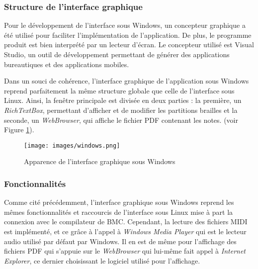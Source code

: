 

\subsubsection{Structure de l'interface graphique}

Pour le développement de l'interface sous Windows, un concepteur graphique a été utilisé pour faciliter l'implémentation de l'application. De plus, le programme produit est bien interprété par un lecteur d'écran. Le concepteur utilisé est Visual Studio, un outil de développement permettant de générer des applications bureautiques et des applications mobiles.

Dans un souci de cohérence, l'interface graphique de l'application sous Windows reprend parfaitement la même structure globale que celle de l'interface sous Linux. Ainsi, la fenêtre principale est divisée en deux parties : la première, un \textit{RichTextBox}, permettant d'afficher et de modifier les partitions brailles et la seconde, un \textit{WebBrowser}, qui affiche le fichier PDF contenant les notes. (voir Figure \ref{windows}).

\begin{figure}[!h]
\begin{center}
  \texttt{[image: images/windows.png]}
  \caption{Apparence de l'interface graphique sous Windows}
  \label{windows}
\end{center}
\end{figure}

\subsubsection{Fonctionnalités}

Comme cité précédemment, l'interface graphique sous Windows reprend les mêmes fonctionnalités et raccourcis de l'interface sous Linux mise à part la connexion avec le compilateur de BMC. Cependant, la lecture des fichiers MIDI est implémenté, et ce grâce à l'appel à \textit{Windows Media Player} qui est le lecteur audio utilisé par défaut par Windows. Il en est de même pour l'affichage des fichiers PDF qui s'appuie sur le \textit{WebBrowser} qui lui-même fait appel à \textit{Internet Explorer}, ce dernier choisissant le logiciel utilisé pour l'affichage.
